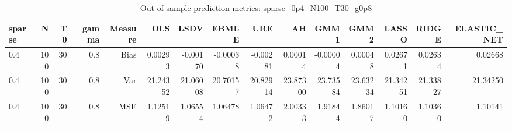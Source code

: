 \begin{table}[!htbp]\centering
\caption{Out-of-sample prediction metrics: sparse_0p4_N100_T30_g0p8}
\label{tab:table3_sparse_0p4_N100_T30_g0p8}
\begin{tabular}{lrrrrrrrrrrrrrr}
\hline
sparse & N & T0 & gamma & Measure & OLS & LSDV & EBMLE & URE & AH & GMM1 & GMM2 & LASSO & RIDGE & ELASTIC_NET \\
\hline
0.4 & 100 & 30 & 0.8 & Bias & 0.00293 & -0.00170 & -0.00038 & -0.00281 & 0.00014 & -0.00004 & 0.00048 & 0.02671 & 0.02634 & 0.02668 \\
0.4 & 100 & 30 & 0.8 & Var & 21.24352 & 21.06008 & 20.70157 & 20.82914 & 23.87300 & 23.73584 & 23.63234 & 21.34251 & 21.33827 & 21.34250 \\
0.4 & 100 & 30 & 0.8 & MSE & 1.12519 & 1.06554 & 1.06478 & 1.06472 & 2.00333 & 1.91844 & 1.86017 & 1.10160 & 1.10360 & 1.10141 \\
\hline
\end{tabular}
\end{table}

